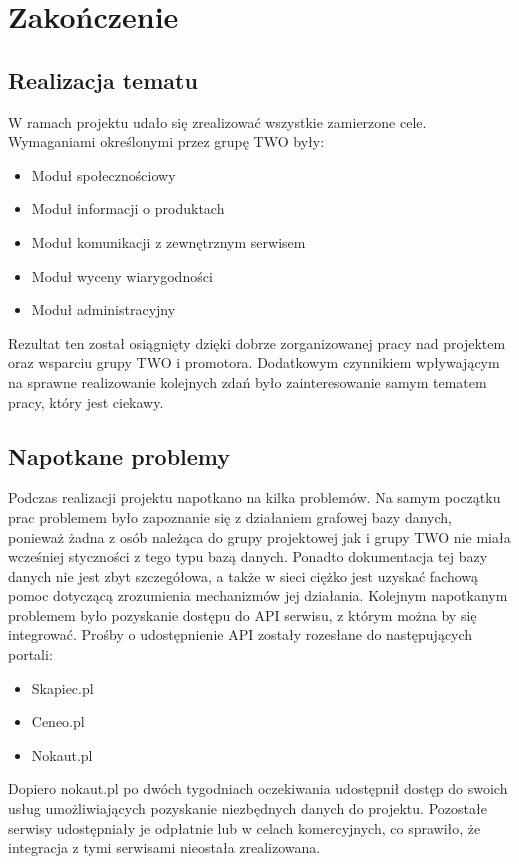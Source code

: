 \chapter{Zakończenie}

\section{Realizacja tematu}

W ramach projektu udało się zrealizować wszystkie zamierzone cele. Wymaganiami określonymi przez grupę TWO były:
\begin{itemize}
\item Moduł społecznościowy
\item Moduł informacji o produktach
\item Moduł komunikacji z zewnętrznym serwisem
\item Moduł wyceny wiarygodności
\item Moduł administracyjny
\end{itemize}
Rezultat ten został osiągnięty dzięki dobrze zorganizowanej pracy nad projektem oraz wsparciu grupy TWO i promotora. Dodatkowym czynnikiem wpływającym na sprawne realizowanie kolejnych zdań było zainteresowanie samym tematem pracy, który jest ciekawy.

\section{Napotkane problemy}

Podczas realizacji projektu napotkano na kilka problemów. Na samym początku prac problemem było zapoznanie się z działaniem grafowej bazy danych, ponieważ żadna z osób należąca do grupy projektowej jak i grupy TWO nie miała wcześniej styczności z tego typu bazą danych. Ponadto dokumentacja tej bazy danych nie jest zbyt szczegółowa, a także w sieci ciężko jest uzyskać fachową pomoc dotyczącą zrozumienia mechanizmów jej działania.
Kolejnym napotkanym problemem było pozyskanie dostępu do API serwisu, z którym można by się integrować. Prośby o udostępnienie API zostały rozesłane do następujących portali:
\begin{itemize}
\item Skapiec.pl
\item Ceneo.pl
\item Nokaut.pl
\end{itemize}
Dopiero nokaut.pl po dwóch tygodniach oczekiwania udostępnił dostęp do swoich usług umożliwiających pozyskanie niezbędnych danych do projektu. Pozostałe serwisy udostępniały je odpłatnie lub w celach komercyjnych, co sprawiło, że integracja z tymi serwisami nieostała zrealizowana.


